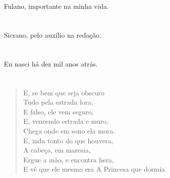 \documentclass[book,A4paper,10pt,twoside,oldfontcommands]{memoir}\usepackage[]{graphicx}\usepackage[usenames,dvipsnames]{color}
\begin{document}

\chapter*{\hspace{7.25cm}{DEDICATÓRIA}}



Fulano, importante na minha vida.


\clearpage


\chapter*{\hspace{6.8cm}{AGRADECIMENTOS}}




Sicrano, pelo auxílio na redação.
\clearpage


\chapter*{\hspace{7.35cm}{BIOGRAFIA}}




Eu nasci há dez mil anos atrás.
\clearpage


\chapter*{\hspace{7.5cm}{EPÍGRAFE}}




\begin{verse}
E, se bem que seja obscuro\\
Tudo pela estrada fora,\\
E falso, ele vem seguro,\\
E, vencendo estrada e muro,\\
Chega onde em sono ela mora.\\
E, inda tonto do que houvera,\\
A cabeça, em maresia,\\
Ergue a mão, e encontra hera,\\
E vê que ele mesmo era A Princesa que dormia.
\end{verse}
\end{document}
